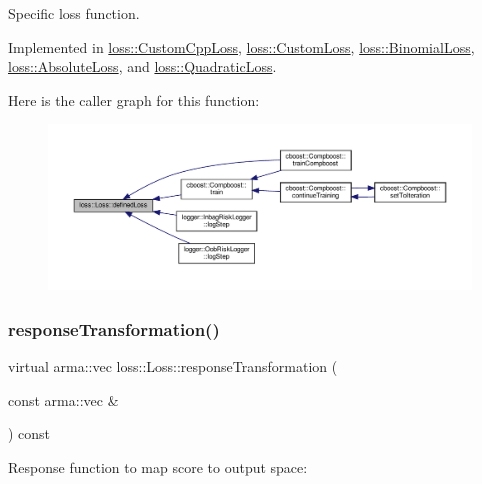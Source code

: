Specific loss function. 



Implemented in \hyperlink{classloss_1_1_custom_cpp_loss_a5611805b67b0542449beb898051ab943}{loss\+::\+Custom\+Cpp\+Loss}, \hyperlink{classloss_1_1_custom_loss_a2a96bc5e4b4894bbaa64745a3f7c0fd5}{loss\+::\+Custom\+Loss}, \hyperlink{classloss_1_1_binomial_loss_aa4570a731257ba43b1b4d6099c0a4515}{loss\+::\+Binomial\+Loss}, \hyperlink{classloss_1_1_absolute_loss_acfef6f0de3cfcccebd4bbfc04133cf1e}{loss\+::\+Absolute\+Loss}, and \hyperlink{classloss_1_1_quadratic_loss_ae34f68243ffe021e309ed73a68796e1e}{loss\+::\+Quadratic\+Loss}.

Here is the caller graph for this function\+:\nopagebreak
\begin{figure}[H]
\begin{center}
\leavevmode
\includegraphics[width=350pt]{classloss_1_1_loss_ae9f94dd9b8311397583ba3a9cb485e94_icgraph}
\end{center}
\end{figure}
\mbox{\label{classloss_1_1_loss_a0a84b7df79b08e40b538aaa7e6ee75c4}} 
\subsubsection{\texorpdfstring{response\+Transformation()}{responseTransformation()}}
{\footnotesize\ttfamily virtual arma\+::vec loss\+::\+Loss\+::response\+Transformation (\begin{DoxyParamCaption}\item[{const arma\+::vec \&}]{ }\end{DoxyParamCaption}) const\hspace{0.3cm}{\ttfamily [pure virtual]}}



Response function to map score to output space\+: 




